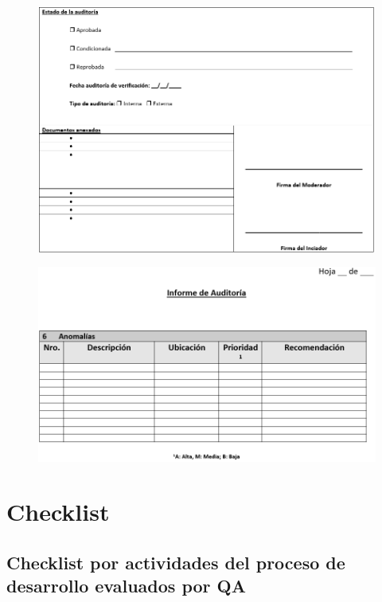 \begin{figure}[H]
\centering
\includegraphics[width=1\textwidth]{figures/anexos/2-5b.PNG}
\end{figure}

\begin{figure}[H]
\centering
\includegraphics[width=1\textwidth]{figures/anexos/2-6.PNG}
\end{figure}

\section{Checklist}

\subsection{Checklist por actividades del proceso de desarrollo evaluados por QA}

